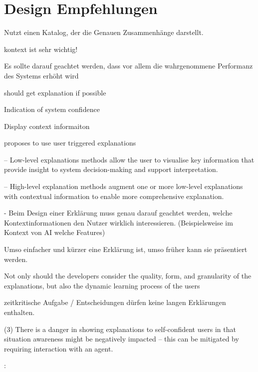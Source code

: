 \section{Design Empfehlungen}
\label{sec:model_design_implications}

\cite{carvalho2020developers} Nutzt einen Katalog, der die Genauen Zusammenhänge darstellt.

kontext ist sehr wichtig! \cite{sato_context_nodate}

Es sollte darauf geachtet werden, dass vor allem die wahrgenommene Performanz des Systems erhöht wird \cite{riveiro_thats_2021}

should get explanation if possible \cite{wiegand_id_2020}

Indication of system confidence \cite{wiegand_id_2020, golledge1999wayfinding}

Display context informaiton \cite{wiegand_id_2020}

\cite{weitz_you_2019} proposes to use user triggered explanations

– Low-level explanations methods allow the user to visualise key information that provide insight to system decision-making and support interpretation. \cite{martin_evaluating_2021}

– High-level explanation methods augment one or more low-level explanations with contextual information to enable more comprehensive explanation. \cite{martin_evaluating_2021}

- Beim Design einer Erklärung muss genau darauf geachtet werden, welche Kontextinformationen den Nutzer wirklich interessieren. (Beispielsweise im Kontext von AI welche Features) \cite{rjoob_towards_2021}

Umso einfacher und kürzer eine Erklärung ist, umso früher kann sie präsentiert werden. \cite{hleg2019policy, sovrano_modelling_2020}

\glqq Not only should the developers consider the quality, form, and granularity of the explanations, but also the dynamic learning process of the users \grqq{} \cite{wang_integration_2020}

\cite{wiegand_id_2020, wiegand2019drive} zeitkritische Aufgabe / Entscheidungen dürfen keine langen Erklärungen enthalten.

(3) There is a danger in showing explanations to self-confident users in that situation awareness might be negatively impacted – this can be mitigated by requiring interaction with an agent. \cite{schaffer_i_2019}


\cite{rosenfeld_explainability_2019}:

